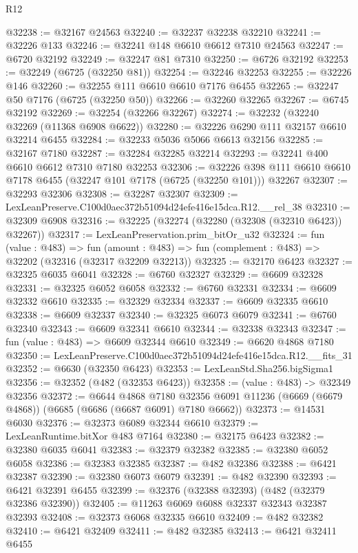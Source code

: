 \begin{lexlean}{R12}
\begin{coremodule}
@32238 := @32167 @24563
@32240 := @32237 @32238 @32210
@32241 := @32226 @133
@32246 := @32241 @148 @6610 @6612 @7310 @24563
@32247 := @6720 @32192
@32249 := @32247 @81 @7310
@32250 := @6726 @32192
@32253 := @32249 (@6725 (@32250 @81))
@32254 := @32246 @32253
@32255 := @32226 @146
@32260 := @32255 @111 @6610 @6610 @7176 @6455
@32265 := @32247 @50 @7176 (@6725 (@32250 @50))
@32266 := @32260 @32265
@32267 := @6745 @32192
@32269 := @32254 (@32266 @32267)
@32274 := @32232 (@32240 @32269 (@11368 @6908 @6622))
@32280 := @32226 @6290 @111 @32157 @6610 @32214 @6455
@32284 := @32233 @5036 @5066 @6613 @32156
@32285 := @32167 @7180
@32287 := @32284 @32285 @32214
@32293 := @32241 @400 @6610 @6612 @7310 @7180 @32253
@32306 := @32226 @398 @111 @6610 @6610 @7178 @6455 (@32247 @101 @7178 (@6725 (@32250 @101))) @32267
@32307 := @32293 @32306
@32308 := @32287 @32307
@32309 := LexLeanPreserve.C100d0aec372b51094d24efe416e15dca.R12.__rel_38
@32310 := @32309 @6908
@32316 := @32225 (@32274 (@32280 (@32308 (@32310 @6423)) @32267))
@32317 := LexLeanPreservation.prim_bitOr_u32
@32324 := fun (value : @483) =>
  fun (amount : @483) => fun (complement : @483) => @32202 (@32316 (@32317 @32209 @32213))
@32325 := @32170 @6423
@32327 := @32325 @6035 @6041
@32328 := @6760 @32327
@32329 := @6609 @32328
@32331 := @32325 @6052 @6058
@32332 := @6760 @32331
@32334 := @6609 @32332 @6610
@32335 := @32329 @32334
@32337 := @6609 @32335 @6610
@32338 := @6609 @32337
@32340 := @32325 @6073 @6079
@32341 := @6760 @32340
@32343 := @6609 @32341 @6610
@32344 := @32338 @32343
@32347 := fun (value : @483) => @6609 @32344 @6610
@32349 := @6620 @4868 @7180
@32350 := LexLeanPreserve.C100d0aec372b51094d24efe416e15dca.R12.__fits_31
@32352 := @6630 (@32350 @6423)
@32353 := LexLeanStd.Sha256.bigSigma1
@32356 := @32352 (@482 (@32353 @6423))
@32358 := (value : @483) -> @32349 @32356
@32372 := @6644
    @4868
    @7180
    @32356
    @6091
    @11236
    (@6669 (@6679 @4868))
    (@6685 (@6686 (@6687 @6091) @7180 @6662))
@32373 := @14531 @6030
@32376 := @32373 @6089 @32344 @6610
@32379 := LexLeanRuntime.bitXor @483 @7164
@32380 := @32175 @6423
@32382 := @32380 @6035 @6041
@32383 := @32379 @32382
@32385 := @32380 @6052 @6058
@32386 := @32383 @32385
@32387 := @482 @32386
@32388 := @6421 @32387
@32390 := @32380 @6073 @6079
@32391 := @482 @32390
@32393 := @6421 @32391 @6455
@32399 := @32376 (@32388 @32393) (@482 (@32379 @32386 @32390))
@32405 := @11263 @6069 @6088 @32337 @32343 @32387 @32393
@32408 := @32373 @6068 @32335 @6610
@32409 := @482 @32382
@32410 := @6421 @32409
@32411 := @482 @32385
@32413 := @6421 @32411 @6455

\end{coremodule}
\end{lexlean}
